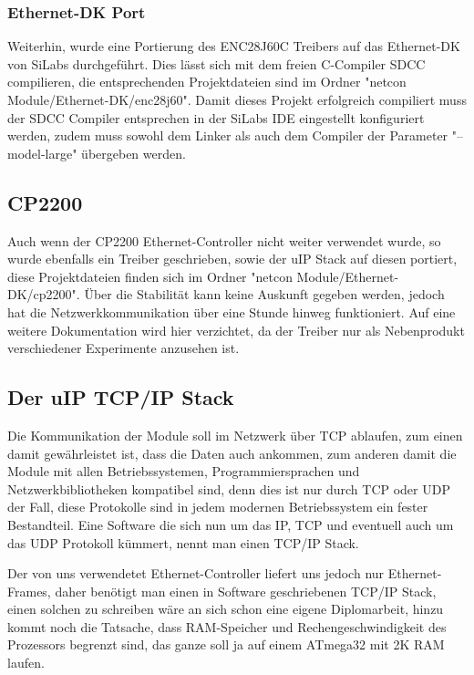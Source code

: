 \documentclass[a4paper,14pt,headsepline]{scrartcl}
\begin{document}
\subsubsection{Ethernet-DK Port}
Weiterhin, wurde eine Portierung des ENC28J60C Treibers auf das Ethernet-DK von SiLabs durchgeführt. Dies lässt sich mit dem freien C-Compiler SDCC compilieren, die entsprechenden Projektdateien sind im Ordner "netcon Module/Ethernet-DK/enc28j60". Damit dieses Projekt erfolgreich compiliert muss der SDCC Compiler entsprechen in der SiLabs IDE eingestellt konfiguriert werden, zudem muss sowohl dem Linker als auch dem Compiler der Parameter "--model-large" übergeben werden.

\subsection{CP2200}
Auch wenn der CP2200 Ethernet-Controller nicht weiter verwendet wurde, so wurde ebenfalls ein Treiber geschrieben, sowie der uIP Stack auf diesen portiert, diese Projektdateien finden sich im Ordner "netcon Module/Ethernet-DK/cp2200". Über die Stabilität kann keine Auskunft gegeben werden, jedoch hat die Netzwerkkommunikation über eine Stunde hinweg funktioniert. Auf eine weitere Dokumentation wird hier verzichtet, da der Treiber nur als Nebenprodukt verschiedener Experimente anzusehen ist.

\subsection{Der uIP TCP/IP Stack}
Die Kommunikation der Module soll im Netzwerk über TCP ablaufen, zum einen damit gewährleistet ist, dass die Daten auch ankommen, zum anderen damit die Module mit allen Betriebssystemen, Programmiersprachen und Netzwerkbibliotheken kompatibel sind, denn dies ist nur durch TCP oder UDP der Fall, diese Protokolle sind in jedem modernen Betriebssystem ein fester Bestandteil. Eine Software die sich nun um das IP, TCP und eventuell auch um das UDP Protokoll kümmert, nennt man einen TCP/IP Stack.

Der von uns verwendetet Ethernet-Controller liefert uns jedoch nur Ethernet-Frames, daher benötigt man einen in Software geschriebenen TCP/IP Stack, einen solchen zu schreiben wäre an sich schon eine eigene Diplomarbeit, hinzu kommt noch die Tatsache, dass RAM-Speicher und Rechengeschwindigkeit des Prozessors begrenzt sind, das ganze soll ja auf einem ATmega32 mit 2K RAM laufen.
\end{document}
